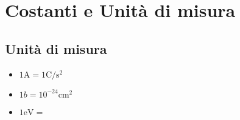 \chapter{Costanti e Unità di misura}
\section{Unità di misura}
\begin{itemize}
        \item $1 \unit{\ampere} = 1 \unit{\coulomb\per\second\squared}$
        \item $1 b = 10^{-24} \unit{\centi\metre\squared}$
        \item $1 \unit{\electronvolt} = $
\end{itemize}
